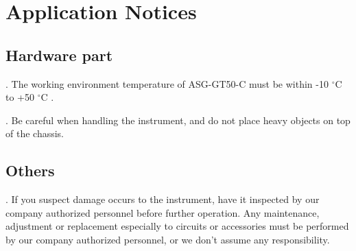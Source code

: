 \chapter{\heiti Application Notices}
\section{\heiti Hardware part}
. The working environment temperature of ASG-GT50-C must be within -10 $^{\circ}$C to +50 $^{\circ}$C .

. Be careful when handling the instrument, and do not place heavy objects on top of the chassis.



%

\section{\heiti Others}
. If you suspect damage occurs to the instrument, have it inspected by our company authorized personnel before further operation. Any maintenance, adjustment or replacement especially to circuits or accessories must be performed by our company authorized personnel, or we don't assume any responsibility.



